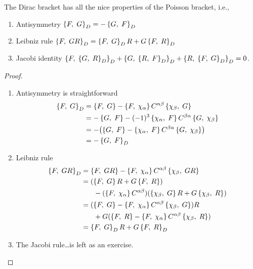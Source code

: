 \begin{theorem}
The Dirac bracket has all the nice properties of the Poisson bracket,
i.e.,
\begin{enumerate}
\item Antisymmetry $\left\{F,\;G\right\}_{D}=-\left\{G,\;F\right\}_{D}$
\item Leibniz rule $\left\{F,\;GR\right\}_{D}=\left\{F,\;G\right\}_{D}R+G\left\{F,\;R\right\}_{D}$
\item Jacobi identity $\left\{F,\;\left\{G,\;R\right\}_{D}\right\}_{D}+\left\{G,\;\left\{R,\;F\right\}_{D}\right\}_{D}+\left\{R,\;\left\{F,\;G\right\}_{D}\right\}_{D}=0$.
\end{enumerate}
\end{theorem}
\begin{proof}
\begin{enumerate}
\item Antisymmetry is straightforward
\begin{subequations}
\begin{align}
\left\{F,\;G\right\}_{D}
&=\left\{F,\;G\right\} - \left\{F,\;\chi_{\alpha}\right\}C^{\alpha\beta}\left\{\chi_{\beta},\;G\right\}\\
&=-\left\{G,\;F\right\} - (-1)^{3}\left\{\chi_{\alpha},\;F\right\}C^{\beta\alpha}\left\{G,\;\chi_{\beta}\right\}\\
&=-\bigl(\left\{G,\;F\right\} - \left\{\chi_{\alpha},\;F\right\}C^{\beta\alpha}\left\{G,\;\chi_{\beta}\right\}\bigr)\\
&=-\left\{G,\;F\right\}_{D}
\end{align}
\end{subequations}
\item Leibniz rule
\begin{subequations}
\begin{align}
\left\{F,\;GR\right\}_{D}
&=\left\{F,\;GR\right\}-\left\{F,\;\chi_{\alpha}\right\}C^{\alpha\beta}\left\{\chi_{\beta},\;GR\right\}\\
&=(\left\{F,\;G\right\}R + G\left\{F,\;R\right\})\nonumber\\
&\phantom{=}\quad-(\left\{F,\;\chi_{\alpha}\right\}C^{\alpha\beta})(\left\{\chi_{\beta},\;G\right\}R+G\left\{\chi_{\beta},\;R\right\})\\
&=(\left\{F,\;G\right\} - \left\{F,\;\chi_{\alpha}\right\}C^{\alpha\beta}\left\{\chi_{\beta},\;G\right\})R\nonumber\\
&\phantom{=}\quad+G(\left\{F,\;R\right\}-\left\{F,\;\chi_{\alpha}\right\}C^{\alpha\beta}\left\{\chi_{\beta},\;R\right\})\\
&=\left\{F,\;G\right\}_{D}R+G\left\{F,\;R\right\}_{D}
\end{align}
\end{subequations}
\item The Jacobi rule\dots is left as an exercise.
\end{enumerate}
\end{proof}

